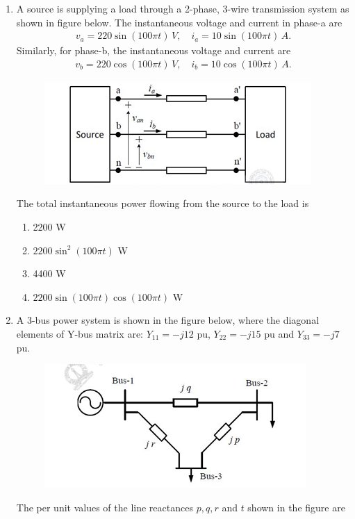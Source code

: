 \documentclass[journal,12pt,onecolumn]{IEEEtran}
\theoremstyle{remark}
\begin{document}
\begin{enumerate}
\item A source is supplying a load through a 2-phase, 3-wire transmission system as shown in figure below. 
The instantaneous voltage and current in phase-a are 
\begin{align*}
    v_a = 220 \sin(100\pi t) \, V, \quad i_a = 10 \sin(100\pi t) \, A.
\end{align*}
Similarly, for phase-b, the instantaneous voltage and current are 
\begin{align*}
    v_b = 220 \cos(100\pi t) \, V, \quad i_b = 10 \cos(100\pi t) \, A.
\end{align*}
\begin{figure}[h!]
    \centering
    \includegraphics[width=0.5\columnwidth]{figs/9.png}
    \label{fig:placeholder}
\end{figure}
The total instantaneous power flowing from the source to the load is  

\begin{multicols}{2}
\begin{enumerate}
\item 2200 W  
\item $2200 \sin^2(100\pi t)$ W  
\item 4400 W  
\item $2200 \sin(100\pi t) \cos(100\pi t)$ W  
\end{enumerate}
\end{multicols}

\item A 3-bus power system is shown in the figure below, where the diagonal elements of Y-bus matrix are:  
$Y_{11} = -j12$ pu, $Y_{22} = -j15$ pu and $Y_{33} = -j7$ pu.  
\begin{figure}[h!]
    \centering
    \includegraphics[width=0.5\columnwidth]{figs/10.png}
    \label{fig:placeholder}
\end{figure}
The per unit values of the line reactances $p, q, r$ and $t$ shown in the figure are  


\end{enumerate}
\end{document}
